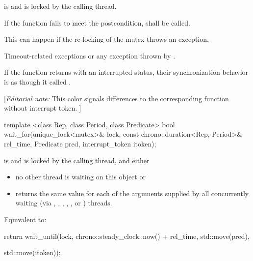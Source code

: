 {\begin{itemdescr}
 \pnum \postconditions {} is  and 
        is locked by the calling thread.

 \pnum \remarks
        If the function fails to meet the postcondition, 
        shall be called.
        \begin{note} This can happen if the re-locking of the mutex throws an exception. \end{note}

 \pnum \throws Timeout-related exceptions or any exception thrown by .

{\color{diffcolor}
 \pnum\sync If the function returns with an interrupted status, 
                their synchronization behavior is as though it called .
}%
\end{itemdescr}



{\color{blue}
[{\itshape{}Editorial note:} {\color{diffcolor}This color signals differences to the corresponding  function without interrupt token.} ]
}

\begin{itemdecl}
template <class Rep, class Period, class Predicate>
  bool wait_for(unique_lock<mutex>& lock,
                const chrono::duration<Rep, Period>& rel_time,
                Predicate pred,
                interrupt_token itoken);
\end{itemdecl}
\begin{itemdescr}
 \pnum \requires {} is  and 
        is locked by the calling thread, and either
        \begin{itemize}
         \item no other thread is waiting on this  object or
         \item {} returns the same value for each of the  arguments
                supplied by all concurrently waiting (via ,
                , 
                {\color{insertcolor}, , , or }) threads.
        \end{itemize}

 \pnum \effects Equivalent to:
\begin{codeblock}
return wait_until(lock, chrono::steady_clock::now() + rel_time, std::move(pred),
\end{codeblock}
{\color{diffcolor}
\begin{codeblock}
                  std::move(itoken));
\end{codeblock}
}


\end{itemdescr}}
